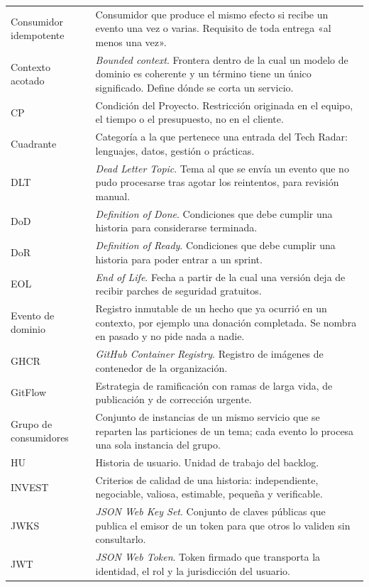 \documentclass[11pt,a4paper]{article}
\begin{document}
\begin{longtable}{L{3.6cm} L{11.0cm}}
Consumidor idempotente & Consumidor que produce el mismo efecto si recibe un evento una vez o varias. Requisito de toda entrega «al menos una vez». \\
Contexto acotado & \emph{Bounded context}. Frontera dentro de la cual un modelo de dominio es coherente y un término tiene un único significado. Define dónde se corta un servicio. \\
CP & Condición del Proyecto. Restricción originada en el equipo, el tiempo o el presupuesto, no en el cliente. \\
Cuadrante & Categoría a la que pertenece una entrada del Tech Radar: lenguajes, datos, gestión o prácticas. \\
DLT & \emph{Dead Letter Topic}. Tema al que se envía un evento que no pudo procesarse tras agotar los reintentos, para revisión manual. \\
DoD & \emph{Definition of Done}. Condiciones que debe cumplir una historia para considerarse terminada. \\
DoR & \emph{Definition of Ready}. Condiciones que debe cumplir una historia para poder entrar a un sprint. \\
EOL & \emph{End of Life}. Fecha a partir de la cual una versión deja de recibir parches de seguridad gratuitos. \\
Evento de dominio & Registro inmutable de un hecho que ya ocurrió en un contexto, por ejemplo una donación completada. Se nombra en pasado y no pide nada a nadie. \\
GHCR & \emph{GitHub Container Registry}. Registro de imágenes de contenedor de la organización. \\
GitFlow & Estrategia de ramificación con ramas de larga vida, de publicación y de corrección urgente. \\
Grupo de consumidores & Conjunto de instancias de un mismo servicio que se reparten las particiones de un tema; cada evento lo procesa una sola instancia del grupo. \\
HU & Historia de usuario. Unidad de trabajo del backlog. \\
INVEST & Criterios de calidad de una historia: independiente, negociable, valiosa, estimable, pequeña y verificable. \\
JWKS & \emph{JSON Web Key Set}. Conjunto de claves públicas que publica el emisor de un token para que otros lo validen sin consultarlo. \\
JWT & \emph{JSON Web Token}. Token firmado que transporta la identidad, el rol y la jurisdicción del usuario. \\

\end{longtable}
\end{document}

